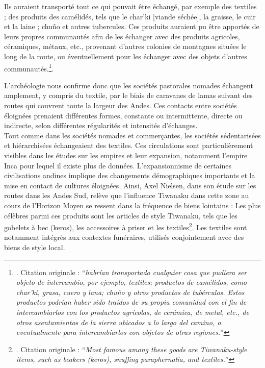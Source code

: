 \begin{citer}
	Ils auraient transporté tout ce qui pouvait être échangé, par exemple des textiles ; des produits des camélidés, tels que le char'ki [viande séchée], la graisse, le cuir et la laine ; chuño et autres tubercules. Ces produits auraient pu être apportés de leurs propres communautés afin de les échanger avec des produits agricoles, céramiques, métaux, etc., provenant d'autres colonies de montagnes situées le long de la route, ou éventuellement pour les échanger avec des objets d'autres communautés.\footnote{\cite[p.~28]{youngMontanaMarIntercambio2017}. Citation originale : \textquotedblleft \textit{habrían transportado cualquier cosa que pudiera ser objeto de intercambio, por ejemplo, textiles; productos de camélidos, como char'ki, grasa, cuero y lana; chuño y otros productos de tubérculos. Estos productos podrían haber sido traídos de su propia comunidad con el fin de intercambiarlos con los productos agrícolas, de cerámica, de metal, etc., de otros asentamientos de la sierra ubicados a lo largo del camino, o eventualmente para intercambiarlos con objetos de otras regiones.}\textquotedblright}.
\end{citer}

L'archéologie nous confirme donc que les sociétés pastorales nomades échangent amplement, y compris du textile, par le biais de caravanes de lamas suivant des routes qui couvrent toute la largeur des Andes. Ces contacts entre sociétés éloignées prenaient différentes formes, constante ou intermittente, directe ou indirecte, selon différentes régularités et intensités d'échanges. \\


Tout comme dans les sociétés nomades et commerçantes, les sociétés sédentarisées et hiérarchisées échangeaient des textiles. Ces circulations sont particulièrement visibles dans les études sur les empires et leur expansion, notamment l'empire Inca pour lequel il existe plus de données. L'expansionnisme de certaines civilisations andines implique des changements démographiques importants et la mise en contact de cultures éloignées. Ainsi, Axel Nielsen, dans son étude sur les routes dans les Andes Sud, relève que l'influence Tiwanaku dans cette zone au cours de l'Horizon Moyen se ressent dans la fréquence de biens lointains : \og Les plus célèbres parmi ces produits sont les articles de style Tiwanaku, tels que les gobelets à bec (keros), les accessoires à priser et les textiles\fg\footnote{\cite[p.~401]{nielsenCirculatingObjectsConstitution2013}. Citation originale : \textquotedblleft \textit{Most famous among these goods are Tiwanaku-style items, such as beakers (keros), snuffing paraphernalia, and textiles.}\textquotedblright}. Les textiles sont notamment intégrés aux contextes funéraires, utilisés conjointement avec des biens de style local. 

